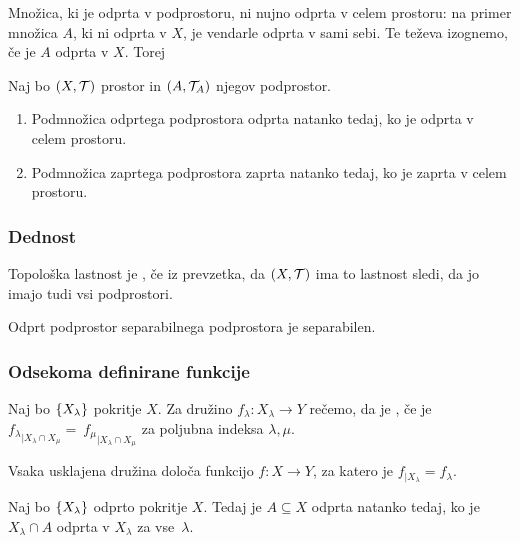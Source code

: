 Množica, ki je odprta v podprostoru, ni nujno odprta v celem prostoru: na primer množica $A$, ki ni odprta v $X$, je vendarle odprta v sami sebi. Te teževa izognemo, če je $A$ odprta v $X$. Torej

\begin{trditev}
    Naj bo $(X, \mathcal{T})$ prostor in $(A, \mathcal{T}_A)$ njegov podprostor.
    \begin{enumerate}
        \item Podmnožica odprtega podprostora odprta natanko tedaj, ko je odprta v celem prostoru.
        \item Podmnožica zaprtega podprostora zaprta natanko tedaj, ko je zaprta v celem prostoru.
    \end{enumerate}
\end{trditev}

\subsubsection{Dednost}
\begin{definicija}
    Topološka lastnost je , če iz prevzetka, da $(X, \mathcal{T})$ ima to lastnost sledi, da jo imajo tudi vsi podprostori.
\end{definicija}

\begin{opomba}
    Odprt podprostor separabilnega podprostora je separabilen.
\end{opomba}

\subsubsection{Odsekoma definirane funkcije}

\begin{definicija}
    Naj bo $\left\{X_\lambda\right\}$ pokritje $X$. Za družino $f_\lambda: X_\lambda \to Y$ rečemo, da je , če je ${f_\lambda}_{|X_\lambda \cap X_\mu} =~{f_\mu}_{|X_\lambda \cap X_\mu}$ za poljubna indeksa $\lambda, \mu$.
\end{definicija}

\begin{trditev}
    Vsaka usklajena družina določa funkcijo $f: X \to Y$, za katero je $f_{|X_\lambda} = f_\lambda$.
\end{trditev}

\begin{lema}
    Naj bo $\left\{X_\lambda\right\}$ odprto pokritje $X$. Tedaj je $A \subseteq X$ odprta natanko tedaj, ko je $X_\lambda \cap A$ odprta v $X_\lambda$ za vse~$\lambda$.
\end{lema}

